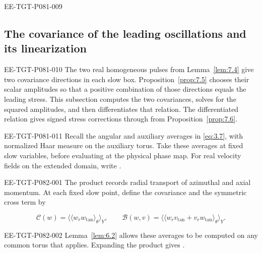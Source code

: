 \begin{EESegment}{EE-TGT-P081-009}
\subsection{The covariance of the leading oscillations and its linearization}
\label{sec:7.3}
\end{EESegment}
\begin{EESegment}{EE-TGT-P081-010}
The two real homogeneous pulses  from Lemma~\ref{lem:7.4} give two covariance directions in each slow box. Proposition~\ref{prop:7.5} chooses their scalar amplitudes  so that a positive combination of those directions equals the leading stress. This subsection computes the two covariances, solves for the squared amplitudes, and then differentiates that relation. The differentiated relation gives signed stress corrections through  from Proposition~\ref{prop:7.6}.
\end{EESegment}

\begin{EESegment}{EE-TGT-P081-011}
Recall the angular and auxiliary averages in \eqref{eq:3.7}, with normalized Haar measure on the auxiliary torus. Take these averages at fixed slow variables, before evaluating at the physical phase map. For real velocity fields  on the extended domain, write .
\end{EESegment}
%
\begin{EESegment}{EE-TGT-P082-001}
The product  records radial transport of azimuthal and axial momentum. At each fixed slow point, define the covariance  and the symmetric cross term  by
\end{EESegment}
\begin{equation}
  \mathcal C(w)=\bigl\langle\langle w_rw_{\mathrm{tan}}\rangle_\theta\bigr\rangle_Y,
  \qquad
  \mathcal B(w,v)=\bigl\langle\langle
  w_rv_{\mathrm{tan}}+v_rw_{\mathrm{tan}}
  \rangle_\theta\bigr\rangle_Y.
  \tag{7.23}\label{eq:7.23}
\end{equation}
\begin{EESegment}{EE-TGT-P082-002}
Lemma~\ref{lem:6.2} allows these averages to be computed on any common torus that applies. Expanding the product gives .
\end{EESegment}

